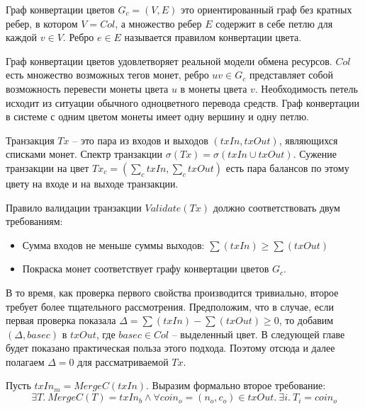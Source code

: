 \documentclass[specification,annotation]{itmo-student-thesis}
\begin{document}
\begin{definition}
Граф конвертации цветов $G_c = (V,E)$ это ориентированный граф без
кратных ребер, в котором $V = Col$, а множество ребер $E$ содержит в
себе петлю для каждой $v \in V$. Ребро $e \in E$ называется правилом
конвертации цвета.
\end{definition}

Граф конвертации цветов удовлетворяет реальной модели обмена
ресурсов. $Col$ есть множество возможных тегов монет, ребро $uv \in
G_c$ представляет собой возможность перевести монеты цвета $u$ в
монеты цвета $v$. Необходимость петель исходит из ситуации обычного
одноцветного перевода средств. Граф конвертации в системе с одним
цветом монеты имеет одну вершину и одну петлю.

\begin{definition}
Транзакция $Tx$ -- это пара из входов и выходов $(txIn, txOut)$,
являющихся списками монет. Спектр транзакции $\sigma(Tx) = \sigma(txIn
\cup txOut)$. Сужение транзакции на цвет $Tx_c = (\sum_c{txIn},
\sum_c{txOut})$ есть пара балансов по этому цвету на входе и на выходе
транзакции.
\end{definition}

Правило валидации транзакции $Validate(Tx)$ должно соответствовать
двум требованиям:
\begin{itemize}
\item Сумма входов не меньше суммы выходов: $\sum(txIn) \geq \sum(txOut)$
\item Покраска монет соответствует графу конвертации цветов $G_c$.
\end{itemize}

В то время, как проверка первого свойства производится тривиально,
второе требует более тщательного рассмотрения. Предположим, что в
случае, если первая проверка показала $\Delta = \sum(txIn) -
\sum(txOut) \geq 0$, то добавим $(\Delta, basec)$ в $txOut$, где
$basec \in Col$ -- выделенный цвет. В следующей главе будет показано
практическая польза этого подхода. Поэтому отсюда и далее полагаем
$\Delta = 0$ для рассматриваемой $Tx$.

Пусть $txIn_m = MergeC(txIn)$. Выразим формально второе требование:
$$
\exists T . \ MergeC(T) = txIn_b \wedge \forall coin_o = (n_o,c_o) \in txOut . \ \exists i . \ T_i = coin_o
$$
\end{document}
